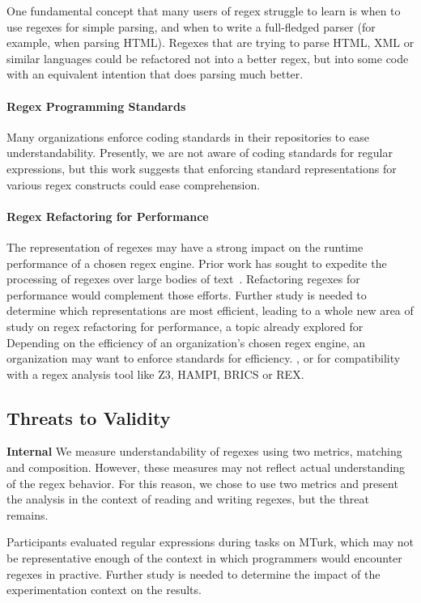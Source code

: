 One fundamental concept that many users of regex struggle to learn is when to use regexes for simple parsing, and when to write a full-fledged parser (for example, when parsing HTML).  Regexes that are trying to parse HTML, XML or similar languages could be refactored not into a better regex, but into some code with an equivalent intention that does parsing much better.

\paragraph{Regex Programming Standards}
Many organizations enforce coding standards in their repositories to ease understandability.
Presently, we are not aware of coding standards for regular expressions, but this work suggests that enforcing standard representations for various regex constructs could ease comprehension.

\paragraph{Regex Refactoring for Performance}
The representation of regexes may have a strong impact on the runtime performance of a chosen regex engine. Prior work has sought to expedite the processing of regexes over large bodies of text~\cite{Baeza-Yates:1996:FTS:235809.235810}.
Refactoring regexes for performance would complement those efforts.
Further study is needed to determine which representations are most efficient, leading to a whole new area of study on regex refactoring for performance, a topic already explored for
Depending on the efficiency of an organization's chosen regex engine, an organization may want to enforce standards for efficiency.
, or for compatibility with a regex analysis tool like Z3, HAMPI, BRICS or REX.

\subsection{Threats to Validity}

\textbf{Internal}
We measure understandability of regexes using two metrics, matching and composition. However, these measures may not reflect actual understanding of the regex behavior. For this reason, we chose to use two metrics and present the analysis in the context of reading and writing regexes, but the threat remains.

Participants evaluated regular expressions during tasks on MTurk, which may not be representative enough of the context in which programmers would encounter regexes in practive. Further study is needed to determine the impact of the experimentation context on the results.

